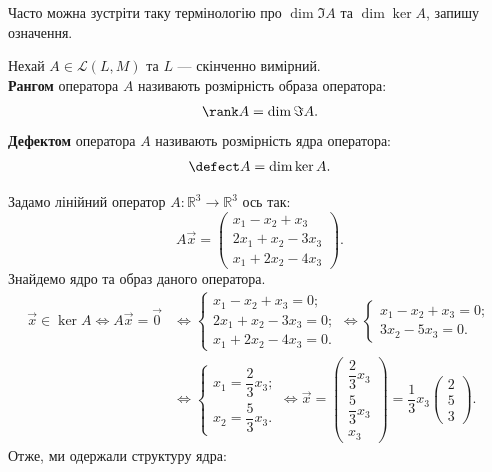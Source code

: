 \documentclass{math_library}
\begin{document}
	Часто можна зустріти таку термінологію про $\dim \Im A$ та $\dim \ker A$, запишу означення.
	
	\begin{definition}
Нехай $A \in \mathcal{L}(L,M)$ та $L$ --- скінченно вимірний.\\
\textbf{Рангом} оператора $A$ називають розмірність образа оператора:
\begin{align*}
\rank A = \dim \Im A.
\end{align*}
\textbf{Дефектом} оператора $A$ називають розмірність ядра оператора:
\begin{align*}
\defect A = \dim{\ker A}.
\end{align*}
	\end{definition}
	
	\begin{example}
	Задамо лінійний оператор $A \colon \mathbb{R}^3 \to \mathbb{R}^3$ ось так:
	\[
	A \vec{x} = \begin{pmatrix}
	x_1 - x_2 + x_3 \\
	2x_1 + x_2 - 3x_3 \\
	x_1 + 2x_2 - 4x_3
	\end{pmatrix}.
	\]
	Знайдемо ядро та образ даного оператора.
	\begin{align*}
	\vec{x} \in \ker A \iff A\vec{x} = \vec{0} & \iff \begin{cases} x_1 - x_2 + x_3 = 0; \\ 2x_1 + x_2 - 3x_3 = 0; \\ x_1 + 2x_2 - 4x_3 = 0. \end{cases} \iff \begin{cases} x_1 - x_2 + x_3 = 0; \\ 3x_2 - 5x_3 = 0. \end{cases} \\
	& \iff \begin{cases} x_1 = \dfrac{2}{3}x_3; \\ x_2 = \dfrac{5}{3}x_3. \end{cases} \iff \vec{x} = \begin{pmatrix} \dfrac{2}{3}x_3 \\ \dfrac{5}{3}x_3 \\ x_3  \end{pmatrix} = \dfrac{1}{3}x_3 \begin{pmatrix} 2 \\ 5 \\ 3 \end{pmatrix}.
	\end{align*}
	Отже, ми одержали структуру ядра:

\end{example}
\end{document}
